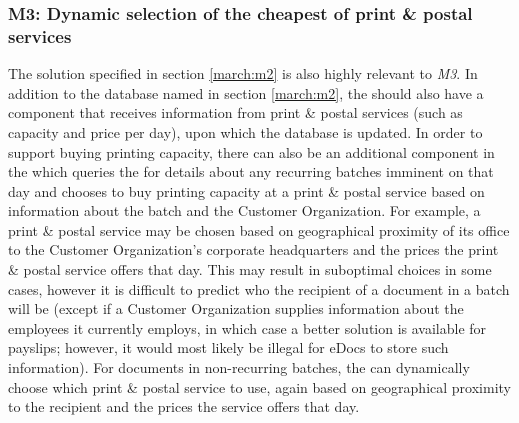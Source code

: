 \subsubsection{M3: Dynamic selection of the cheapest of print \& postal services}\label{march:m3}
The solution specified in section \ref{march:m2} is also highly relevant to \emph{M3}. In addition to the database named in section \ref{march:m2}, the  should also have a component that receives information from print \& postal services (such as capacity and price per day), upon which the database is updated. In order to support buying printing capacity, there can also be an additional component in the  which queries the  for details about any recurring batches imminent on that day and chooses to buy printing capacity at a print \& postal service based on information about the batch and the Customer Organization. For example, a print \& postal service may be chosen based on geographical proximity of its office to the Customer Organization's corporate headquarters and the prices the print \& postal service offers that day. This may result in suboptimal choices in some cases, however it is difficult to predict who the recipient of a document in a batch will be (except if a Customer Organization supplies information about the employees it currently employs, in which case a better solution is available for payslips; however, it would most likely be illegal for eDocs to store such information). For documents in non-recurring batches, the  can dynamically choose which print \& postal service to use, again based on geographical proximity to the recipient and the prices the service offers that day.
